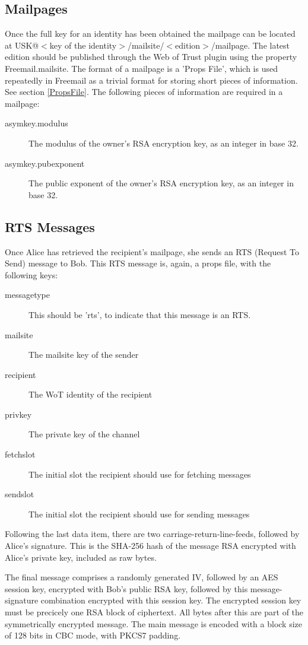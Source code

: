 \documentclass[12pt,a4paper]{article}
\begin{document}
\subsection{Mailpages}
Once the full key for an identity has been obtained the mailpage can be located at
USK@$<$key of the identity$>$/mailsite/$<$edition$>$/mailpage. The latest edition should be published
through the Web of Trust plugin using the property Freemail.mailsite. The format of a
mailpage is a 'Props File', which is used repeatedly in Freemail as a trivial format for storing
short pieces of information. See section \ref{PropsFile}.
The following pieces of information are required in a mailpage:

\begin{description}
\item[asymkey.modulus] The modulus of the owner's RSA encryption key, as an integer in base 32.
\item[asymkey.pubexponent] The public exponent of the owner's RSA encryption key, as an integer in
	base 32.
\end{description}

\subsection{RTS Messages}
Once Alice has retrieved the recipient's mailpage, she sends an RTS (Request To Send) message to Bob. This RTS message
is, again, a props file, with the following keys:

\begin{description}
\item[messagetype] This should be 'rts', to indicate that this message is an RTS.
\item[mailsite] The mailsite key of the sender
\item[recipient] The WoT identity of the recipient
\item[privkey] The private key of the channel
\item[fetchslot] The initial slot the recipient should use for fetching messages
\item[sendslot] The initial slot the recipient should use for sending messages
\end{description}

Following the last data item, there are two carriage-return-line-feeds, followed by Alice's
signature. This is the SHA-256 hash of the message RSA encrypted with Alice's private key, included
as raw bytes.

The final message comprises a randomly generated IV, followed by an AES session key, encrypted with
Bob's public RSA key, followed by this message-signature combination encrypted with this session
key. The encrypted session key must be precicely one RSA block of ciphertext. All bytes after this
are part of the symmetrically encrypted message. The main message is encoded with a block size of
128 bits in CBC mode, with PKCS7 padding.
\end{document}
